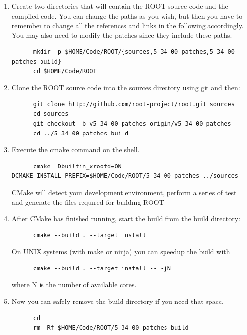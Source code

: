 \begin{enumerate}[resume]
\item\label{root-2} Create two directories that will contain the ROOT source
  code and the compiled code. You can change the paths as you wish, but then you
  have to remember to change all the references and links in the following
  accordingly. You may also need to modify the patches since they include these
  paths.
\begin{lstlisting}
      mkdir -p $HOME/Code/ROOT/{sources,5-34-00-patches,5-34-00-patches-build}
      cd $HOME/Code/ROOT
\end{lstlisting}
\item\label{root-3} Clone the ROOT source code into the sources directory using
  git and then:
\begin{lstlisting}
      git clone http://github.com/root-project/root.git sources
      cd sources
      git checkout -b v5-34-00-patches origin/v5-34-00-patches
      cd ../5-34-00-patches-build
\end{lstlisting}
\item\label{root-4} Execute the cmake command on the shell.
\begin{lstlisting}
      cmake -Dbuiltin_xrootd=ON -DCMAKE_INSTALL_PREFIX=$HOME/Code/ROOT/5-34-00-patches ../sources
\end{lstlisting}
  CMake will detect your development environment, perform a series of test and
  generate the files required for building ROOT.\@
\item After CMake has finished running, start the build from the build
  directory:
\begin{lstlisting}
      cmake --build . --target install
\end{lstlisting}
  On UNIX systems (with make or ninja) you can speedup the build with%
\begin{lstlisting}
      cmake --build . --target install -- -jN
\end{lstlisting}
  where N is the number of available cores.
\item Now you can safely remove the build directory if you need that space.
\begin{lstlisting}
      cd
      rm -Rf $HOME/Code/ROOT/5-34-00-patches-build
\end{lstlisting}


\end{enumerate}
